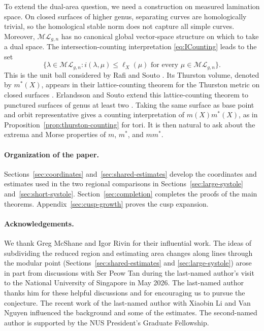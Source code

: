 \documentclass[10pt,twoside]{article}
\theoremstyle{plain}
\theoremstyle{definition}
\theoremstyle{remark}
\begin{document}
To extend the dual-area question, we need a construction on
measured lamination space. On closed surfaces of higher genus,
separating curves are homologically trivial, so the homological
stable norm does not capture all simple curves.
Moreover, $\mathcal{ML}_{g,n}$ has no canonical global
vector-space structure on which to take a dual space.
The intersection-counting interpretation \eqref{eq:ICounting} leads to the set
$$
\{\lambda\in\mathcal{ML}_{g,n}:
i(\lambda,\mu)\leq\ell_X(\mu)
\text{ for every }\mu\in\mathcal{ML}_{g,n}\}.
$$
This is the unit ball considered by Rafi and Souto
\cite[Equation~(1.2)]{RafiSouto}.
Its Thurston volume, denoted by $m^*(X)$, appears in their lattice-counting theorem
for the Thurston metric on closed surfaces
\cite[Theorem~1.1]{RafiSouto}.
Erlandsson and Souto extend this lattice-counting theorem to
punctured surfaces of genus at least two
\cite[Theorem~12.6 and Exercise~12.6]{ErlandssonSoutoBook}.
Taking the same surface as base point and orbit representative
gives a counting interpretation of $m(X)m^*(X)$, as in
Proposition~\ref{prop:thurston-counting} for tori. It is then natural
to ask about the extrema and Morse properties of $m$, $m^*$, and
$mm^*$.
\paragraph{Organization of the paper.}
Sections~\ref{sec:coordinates} and~\ref{sec:shared-estimates}
develop the coordinates and estimates used in the two regional
comparisons in Sections~\ref{sec:large-systole} and~\ref{sec:short-systole}.
Section~\ref{sec:completion} completes the proofs of the main theorems.
Appendix~\ref{sec:cusp-growth} proves the cusp expansion.

\paragraph{Acknowledgements.}
We thank Greg McShane and Igor Rivin for their influential work.
The ideas of subdividing the reduced region and estimating
area changes along lines through the modular point
(Sections~\ref{sec:shared-estimates} and
\ref{sec:large-systole}) arose in part from discussions
with Ser Peow Tan during the last-named author's visit to the
National University of Singapore in May 2026.
The last-named author thanks him for these helpful discussions
and for encouraging us to pursue the conjecture.
The recent work \cite{DLN} of the last-named author with Xiaobin Li
and Van Nguyen influenced the background and some of the estimates.
The second-named author is supported by the NUS President's
Graduate Fellowship.
\end{document}
